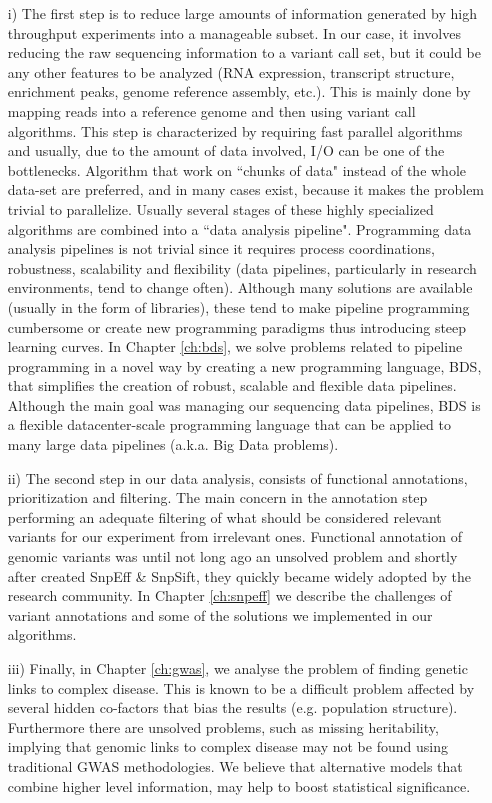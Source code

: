 \begin{itemize}
\item[i)] The first step is to reduce large amounts of information generated by high throughput experiments into a manageable subset. In our case, it involves reducing the raw sequencing information to a variant call set, but it could be any other features to be analyzed (RNA expression, transcript structure, enrichment peaks, genome reference assembly, etc.). This is mainly done by mapping reads into a reference genome and then using variant call algorithms. This step is characterized by requiring fast parallel algorithms and usually, due to the amount of data involved, I/O can be one of the bottlenecks. Algorithm that work on ``chunks of data" instead of the whole data-set are preferred, and in many cases exist, because it makes the problem trivial to parallelize. Usually several stages of these highly specialized algorithms are combined into a ``data analysis pipeline". Programming data analysis pipelines is not trivial since it requires process coordinations, robustness, scalability and flexibility (data pipelines, particularly in research environments, tend to change often). Although many solutions are available (usually in the form of libraries), these tend to make pipeline programming cumbersome or create new programming paradigms thus introducing steep learning curves. In Chapter \ref{ch:bds}, we solve problems related to pipeline programming in a novel way by creating a new programming language, BDS, that simplifies the creation of robust, scalable and flexible data pipelines. Although the main goal was managing our sequencing data pipelines, BDS is a flexible datacenter-scale programming language that can be applied to many large data pipelines (a.k.a. Big Data problems).

\item[ii)] The second step in our data analysis, consists of functional annotations, prioritization and filtering. The main concern in the annotation step performing an adequate filtering of what should be considered relevant variants for our experiment from irrelevant ones. Functional annotation of genomic variants was until not long ago an unsolved problem and shortly after created SnpEff \& SnpSift, they quickly became widely adopted by the research community. In Chapter \ref{ch:snpeff} we describe the challenges of variant annotations and some of the solutions we implemented in our algorithms.

\item[iii)] Finally, in Chapter \ref{ch:gwas}, we analyse the problem of  finding genetic links to complex disease. This is known to be a difficult problem affected by several hidden co-factors that bias the results (e.g. population structure). Furthermore there are unsolved problems, such as missing heritability, implying that genomic links to complex disease may not be found using traditional GWAS methodologies. We believe that alternative models that combine higher level information, may help to boost statistical significance. 


\end{itemize}
